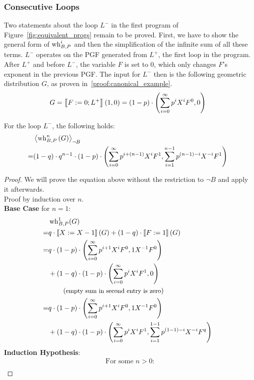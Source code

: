 \subsubsection*{Consecutive Loops}
Two statements about the loop $L^-$ in the first program of Figure~\ref{fig:equivalent_progs} remain to be proved.
First, we have to show the general form of $\operatorname{wh}_{B, P}^i$ and then the simplification of the infinite sum of all these terms.
$L^-$ operates on the PGF generated from $L^+$, the first loop in the program.
After $L^+$ and before $L^-$, the variable $F$ is set to 0, which only changes $F$'s exponent in the previous PGF.
The input for $L^-$ then is the following geometric distribution $G$, as proven in~\ref{proof:canonical_example}.
\[ G = \left\llbracket F := 0; L^+ \right\rrbracket\left( 1, 0 \right)
	= (1-p) \cdot \left( \sum_{i = 0}^{\infty} p^i X^i F^0, 0 \right) \]
\begin{lemma}
	For the loop $L^-$, the following holds:
	\begin{align*}
		 & \left\langle  \operatorname{wh}_{B, P}^n\left( G \right)  \right\rangle_{\lnot B} \\
		=& (1-q) \cdot q^{n-1} \cdot (1-p) \cdot \left( 
			\sum_{i=0}^{\infty} p^{i+(n-1)} X^i F^1,
			\sum_{i=1}^{n-1} p^{(n-1)-i} X^{-i} F^1 \right)
	\end{align*}
	\begin{proof}
		We will prove the equation above without the restriction to $\lnot B$ and apply it afterwards. \\
		Proof by induction over $n$. \\
		\textbf{Base Case} for $n = 1$: \\
		\begin{align*}
			 & \operatorname{wh}_{B, P}^1(G) \\
			=& q \cdot \left\llbracket X := X - 1 \right\rrbracket(G) + (1-q) \cdot \left\llbracket F := 1 \right\rrbracket(G) \\
			=& q \cdot (1-p) \cdot \left( \sum_{i = 0}^{\infty} p^{i+1} X^i F^0,
				1 X^{-1} F^0 \right) \\
			 & + (1-q) \cdot (1-p) \cdot \left( \sum_{i = 0}^{\infty} p^i X^i F^1, 0 \right) \\
			 & \hspace*{2em} \left(\text{\small empty sum in second entry is zero}\right) \\
			=& q \cdot (1-p) \cdot \left( \sum_{i = 0}^{\infty} p^{i+1} X^i F^0,
				1 X^{-1} F^0 \right) \\
			 & + (1-q) \cdot (1-p) \cdot \left( \sum_{i = 0}^{\infty} p^i X^i F^1,
			 	\sum_{i=1}^{1-1} p^{(1-1)-i} X^{-i} F^q \right)
		\end{align*}
		\textbf{Induction Hypothesis}:
		\begin{align*}
			 & \text{For some } n > 0 \colon \\

\end{align*}
\end{proof}
\end{lemma}
